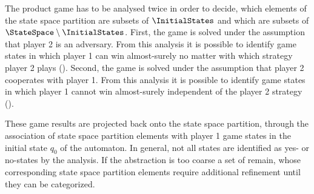 The product game has to be analysed twice in order to decide, which elements of the state space partition are subsets of $\InitialStates$ and which are subsets of $\StateSpace \setminus \InitialStates$.
First, the game is solved under the assumption that player 2 is an adversary.
From this analysis it is possible to identify game states in which player 1 can win almost-surely no matter with which strategy player 2 plays ().
Second, the game is solved under the assumption that player 2 cooperates with player 1.
From this analysis it is possible to identify game states in which player 1 cannot win almost-surely independent of the player 2 strategy ().

These game results are projected back onto the state space partition, through the association of state space partition elements with player 1 game states in the initial state $q_0$ of the automaton.
In general, not all states are identified as yes- or no-states by the analysis.
If the abstraction is too coarse a set of  remain, whose corresponding state space partition elements require additional refinement until they can be categorized.


    \startalgorithmic[numbering=no,margin=0em]
    \stopalgorithmic
    \startalgorithmic
        \DO
            \DO
                \DO
    \stopalgorithmic
\stopbuffer

